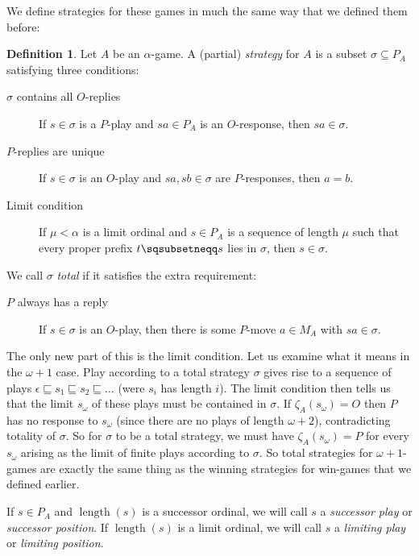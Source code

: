 \documentclass[11pt]{article} %
\theoremstyle{plain} %
\theoremstyle{definition} %
\newtheorem{definition}[theorem]{Definition}
\theoremstyle{note}
\theoremstyle{exercisestyle}
\newcommand{\emptyplay}{\epsilon}
\newcommand{\prefix}{\sqsubseteq}
\newcommand{\pprefix}{\sqsubsetneqq}
\DeclareMathOperator{\length}{length}
\renewcommand{\subset}{\subseteq}
\begin{document}
We define strategies for these games in much the same way that we defined them before:

\begin{definition}
  Let $A$ be an $\alpha$-game.  A (partial) \emph{strategy} for $A$ is a subset $\sigma\subset P_A$ satisfying three conditions:
  \begin{description}
    \item[$\sigma$ contains all $O$-replies] If $s\in\sigma$ is a $P$-play and $sa\in P_A$ is an $O$-response, then $sa\in\sigma$.
    \item[$P$-replies are unique] If $s\in\sigma$ is an $O$-play and $sa,sb\in\sigma$ are $P$-responses, then $a=b$.
    \item[Limit condition] If $\mu<\alpha$ is a limit ordinal and $s\in P_A$ is a sequence of length $\mu$ such that every proper prefix $t\pprefix s$ lies in $\sigma$, then $s\in\sigma$.
  \end{description}

  We call $\sigma$ \emph{total} if it satisfies the extra requirement:

  \begin{description}
    \item[$P$ always has a reply] If $s\in\sigma$ is an $O$-play, then there is some $P$-move $a\in M_A$ with $sa\in\sigma$.
  \end{description}
\end{definition}

The only new part of this is the limit condition.  Let us examine what it means in the $\omega+1$ case.  Play according to a total strategy $\sigma$ gives rise to a sequence of plays $\emptyplay \prefix s_1\prefix s_2\prefix\dots$ (were $s_i$ has length $i$).  The limit condition then tells us that the limit $s_\omega$ of these plays must be contained in $\sigma$.  If $\zeta_A(s_\omega)=O$ then $P$ has no response to $s_\omega$ (since there are no plays of length $\omega+2$), contradicting totality of $\sigma$.  So for $\sigma$ to be a total strategy, we must have $\zeta_A(s_\omega)=P$ for every $s_\omega$ arising as the limit of finite plays according to $\sigma$.  So total strategies for $\omega+1$-games are exactly the same thing as the winning strategies for win-games that we defined earlier.  

If $s\in P_A$ and $\length(s)$ is a successor ordinal, we will call $s$ a \emph{successor play} or \emph{successor position}.  If $\length(s)$ is a limit ordinal, we will call $s$ a \emph{limiting play} or \emph{limiting position}.
\end{document}
